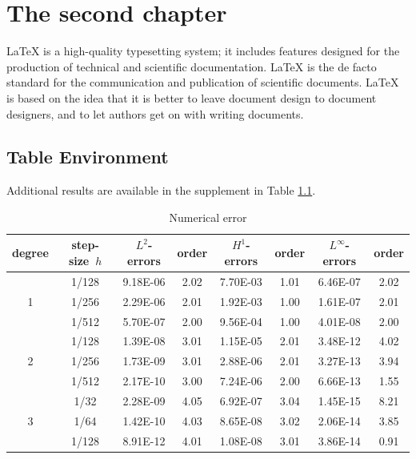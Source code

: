 \documentclass[openany,twoside,12pt]{book}
\theoremstyle{plain}
\numberwithin{equation}{chapter}
\numberwithin{figure}{chapter}
\numberwithin{table}{chapter}
\begin{document}
\chapter{The second chapter}

LaTeX is a high-quality typesetting system; it includes features designed
for the production of technical and scientific documentation.
LaTeX is the de facto standard for the communication and publication of scientific documents.
LaTeX is based on the idea that it is better to leave document design to
document designers, and to let authors get on with writing documents.

\section{Table Environment}

Additional results are available in the supplement in Table \ref{tab:foo}.

\begin{table}[!htp]
\centering
\renewcommand\arraystretch{1.2} %
\caption{Numerical error}
\label{tab:foo}
\begin{tabular}{c|c|cc|cc|cc}
\hline
degree &  step-size~$h$  & $L^2$-errors  &  order  & $H^1$-errors & order & $L^\infty$-errors  &  order \\
\hline
   &  1/128    & 9.18E-06    &2.02    & 7.70E-03  &1.01       & 6.46E-07    &2.02   \\
1  &  1/256    & 2.29E-06    &2.01    & 1.92E-03  &1.00       & 1.61E-07    &2.01   \\
   &  1/512    & 5.70E-07    &2.00    & 9.56E-04  &1.00       & 4.01E-08    &2.00   \\
\hline  %
   &  1/128    & 1.39E-08    &3.01    & 1.15E-05  &2.01       & 3.48E-12   &4.02    \\
2  &  1/256    & 1.73E-09    &3.01    & 2.88E-06  &2.01       & 3.27E-13   &3.94    \\
   &  1/512    & 2.17E-10    &3.00    & 7.24E-06  &2.00       & 6.66E-13   &1.55    \\
\hline  %
   &  1/32     & 2.28E-09    &4.05    & 6.92E-07  &3.04       & 1.45E-15   &8.21    \\
3  &  1/64     & 1.42E-10    &4.03    & 8.65E-08  &3.02       & 2.06E-14   &3.85    \\
   &  1/128    & 8.91E-12    &4.01    & 1.08E-08  &3.01       & 3.86E-14   &0.91    \\
\hline
\end{tabular}
\end{table}
\end{document}
